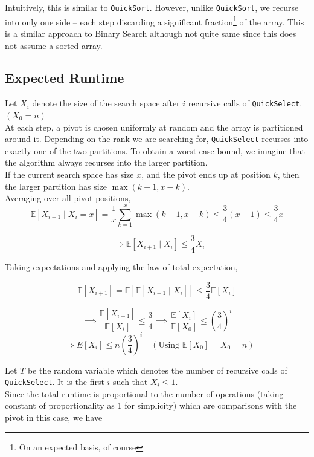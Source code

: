 \documentclass[11pt,openany]{book}
\begin{document}
\noindent Intuitively, this is similar to \texttt{QuickSort}. However, unlike \texttt{QuickSort}, 
we recurse into only one side -- each step discarding a significant 
fraction\footnote{On an expected basis, of course} of 
the array. This is a similar approach to Binary Search although not quite same since this does not assume a sorted array.

\subsection{Expected Runtime}

Let \(X_i\) denote the size of the search space after \(i\) recursive calls of 
\texttt{QuickSelect}. $(X_0=n)$\\

\noindent At each step, a pivot is chosen uniformly at random and the array is partitioned around it.
Depending on the rank we are searching for, \texttt{QuickSelect} recurses into exactly one of the two partitions. 
To obtain a worst-case bound, we imagine that the algorithm always recurses into the larger partition.\\


\noindent If the current search space has size \(x\), and the pivot ends up at position \(k\), 
then the larger partition has size $\max(k-1,x-k)$.\\

\noindent Averaging over all pivot positions,
\[
\mathbb E[X_{i+1}\mid X_i=x]
=
\frac1x
\sum_{k=1}^{x}
\max(k-1,x-k)
\le
\frac34(x-1)
\le
\frac34x
\]

\[
\implies
\mathbb E[X_{i+1}\mid X_i]
\le
\frac34 X_i
\]

Taking expectations and applying the law of total expectation,

\[
\mathbb E[X_{i+1}]
=
\mathbb E\!\left[\mathbb E[X_{i+1}\mid X_i]\right]
\le
\frac34\mathbb E[X_i]
\]

\[
\implies \frac{\mathbb E[X_{i+1}]}{\mathbb E[X_i]} \le \frac34
\implies
\frac{\mathbb E[X_i]}{\mathbb E[X_0]}
\le
\left(\frac34\right)^i
\]
\[
\implies E[X_i] \le n (\frac{3}{4})^i \quad (\text{Using }\mathbb E[X_0]=X_0=n)
\]

\noindent Let $T$ be the random variable which denotes the number of recursive calls of \texttt{QuickSelect}. 
It is the first $i$ such that $X_i \le 1$. \\


\noindent Since the total runtime is proportional to the number of operations (taking 
constant of proportionality as 1 for simplicity) which 
are comparisons with the pivot in this case, we have 
\end{document}

